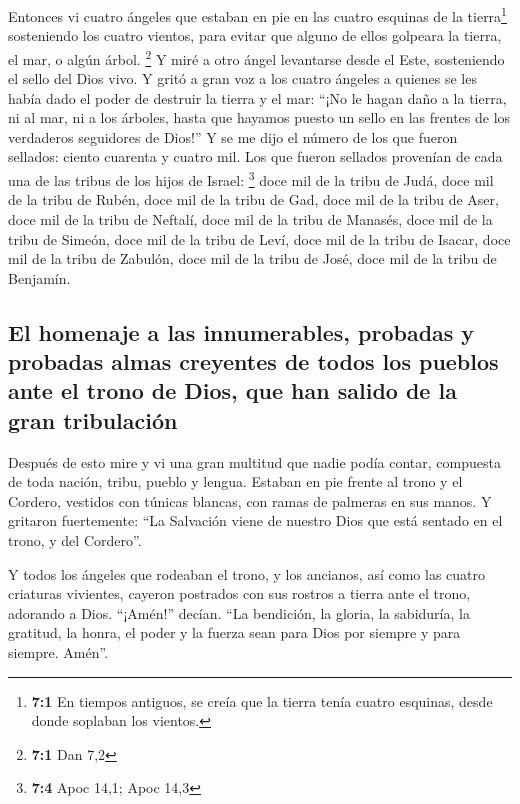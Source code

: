  Entonces vi cuatro ángeles que estaban en pie en las
cuatro esquinas de la tierra\footnote{\textbf{7:1} En tiempos antiguos,
  se creía que la tierra tenía cuatro esquinas, desde donde soplaban los
  vientos.} sosteniendo los cuatro vientos, para evitar que alguno de
ellos golpeara la tierra, el mar, o algún árbol. \footnote{\textbf{7:1}
  Dan 7,2}  Y miré a otro ángel levantarse desde el Este,
sosteniendo el sello del Dios vivo. Y gritó a gran voz a los cuatro
ángeles a quienes se les había dado el poder de destruir la tierra y el
mar:  ``¡No le hagan daño a la tierra, ni al mar, ni a los
árboles, hasta que hayamos puesto un sello en las frentes de los
verdaderos seguidores de Dios!''  Y se me dijo el número
de los que fueron sellados: ciento cuarenta y cuatro mil. Los que fueron
sellados provenían de cada una de las tribus de los hijos de Israel:
\footnote{\textbf{7:4} Apoc 14,1; Apoc 14,3}  doce mil de
la tribu de Judá, doce mil de la tribu de Rubén, doce mil de la tribu de
Gad,  doce mil de la tribu de Aser, doce mil de la tribu
de Neftalí, doce mil de la tribu de Manasés,  doce mil de
la tribu de Simeón, doce mil de la tribu de Leví, doce mil de la tribu
de Isacar,  doce mil de la tribu de Zabulón, doce mil de
la tribu de José, doce mil de la tribu de Benjamín.

\hypertarget{el-homenaje-a-las-innumerables-probadas-y-probadas-almas-creyentes-de-todos-los-pueblos-ante-el-trono-de-dios-que-han-salido-de-la-gran-tribulaciuxf3n}{%
\subsection{El homenaje a las innumerables, probadas y probadas almas
creyentes de todos los pueblos ante el trono de Dios, que han salido de
la gran
tribulación}\label{el-homenaje-a-las-innumerables-probadas-y-probadas-almas-creyentes-de-todos-los-pueblos-ante-el-trono-de-dios-que-han-salido-de-la-gran-tribulaciuxf3n}}

 Después de esto mire y vi una gran multitud que nadie
podía contar, compuesta de toda nación, tribu, pueblo y lengua. Estaban
en pie frente al trono y el Cordero, vestidos con túnicas blancas, con
ramas de palmeras en sus manos.  Y gritaron fuertemente:
``La Salvación viene de nuestro Dios que está sentado en el trono, y del
Cordero''.

 Y todos los ángeles que rodeaban el trono, y los
ancianos, así como las cuatro criaturas vivientes, cayeron postrados con
sus rostros a tierra ante el trono, adorando a Dios. 
``¡Amén!'' decían. ``La bendición, la gloria, la sabiduría, la gratitud,
la honra, el poder y la fuerza sean para Dios por siempre y para
siempre. Amén''.

